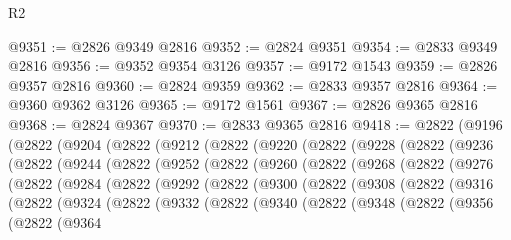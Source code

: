 \begin{lexlean}{R2}
\begin{coremodule}
@9351 := @2826 @9349 @2816
@9352 := @2824 @9351
@9354 := @2833 @9349 @2816
@9356 := @9352 @9354 @3126
@9357 := @9172 @1543
@9359 := @2826 @9357 @2816
@9360 := @2824 @9359
@9362 := @2833 @9357 @2816
@9364 := @9360 @9362 @3126
@9365 := @9172 @1561
@9367 := @2826 @9365 @2816
@9368 := @2824 @9367
@9370 := @2833 @9365 @2816
@9418 := @2822
    (@9196
      (@2822
        (@9204
          (@2822
            (@9212
              (@2822
                (@9220
                  (@2822
                    (@9228
                      (@2822
                        (@9236
                          (@2822
                            (@9244
                              (@2822
                                (@9252
                                  (@2822
                                    (@9260
                                      (@2822
                                        (@9268
                                          (@2822
                                            (@9276
                                              (@2822
                                                (@9284
                                                  (@2822
                                                    (@9292
                                                      (@2822
                                                        (@9300
                                                          (@2822
                                                            (@9308
                                                              (@2822
                                                                (@9316
                                                                  (@2822
                                                                    (@9324
                                                                      (@2822
                                                                        (@9332
                                                                          (@2822
                                                                            (@9340
                                                                              (@2822
                                                                                (@9348
                                                                                  (@2822
                                                                                    (@9356
                                                                                      (@2822
                                                                                        (@9364

\end{coremodule}
\end{lexlean}
